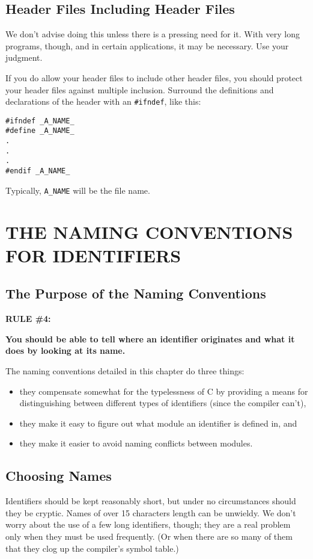 \subsection{Header Files Including Header Files}
We don't advise doing this unless there is a pressing need for it.
With very long programs, though, and in certain applications, it may
be necessary.  Use your judgment.

If you do allow your header files to include other header files, you
should protect your header files against multiple inclusion.  Surround
the definitions and declarations of the header with an {\tt \#ifndef},
like this:
\begin{verbatim}
#ifndef _A_NAME_
#define _A_NAME_
.
.
.
#endif _A_NAME_
\end{verbatim}

Typically, {\tt A\_NAME} will be the file name.

\newpage
\section{\bf THE NAMING CONVENTIONS FOR IDENTIFIERS}
\subsection{The Purpose of the Naming Conventions}
{\bf RULE \#4:}

{\bf You should be able to tell where an identifier originates and
what it does by looking at its name.}\vspace{.25 in}

The naming conventions detailed in this chapter do three things:
\begin{itemize}
\item they compensate somewhat for the typelessness of C by providing
a means for distinguishing between different types of identifiers
(since the compiler can't),
\item they make it easy to figure out what module an identifier is defined
in, and
\item they make it easier to avoid naming conflicts between modules.
\end{itemize}

\subsection{Choosing Names}
Identifiers should be kept reasonably short, but under no
circumstances should they be cryptic.  Names of over 15 characters
length can be unwieldy.  We don't worry about the use of a few long
identifiers, though; they are a real problem only when they must be
used frequently.  (Or when there are so many of them that they clog up
the compiler's symbol table.)



